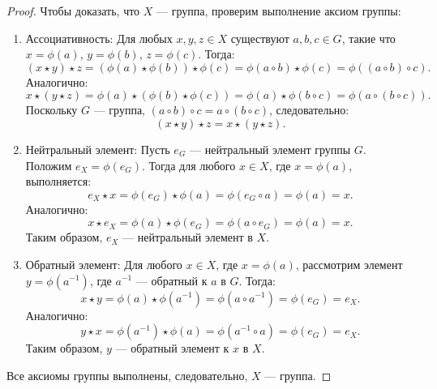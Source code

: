 \begin{proof}
    Чтобы доказать, что \( X \) — группа, проверим выполнение аксиом группы:
    \begin{enumerate}
        \item Ассоциативность:
              Для любых \( x, y, z \in X \) существуют \( a, b, c \in G \), такие что \( x = \phi(a) \), \( y = \phi(b) \), \( z = \phi(c) \). Тогда:
              \[
              (x \star y) \star z = (\phi(a) \star \phi(b)) \star \phi(c) = \phi(a \circ b) \star \phi(c) = \phi((a \circ b) \circ c).
              \]
              Аналогично:
              \[
              x \star (y \star z) = \phi(a) \star (\phi(b) \star \phi(c)) = \phi(a) \star \phi(b \circ c) = \phi(a \circ (b \circ c)).
              \]
              Поскольку \( G \) — группа, \( (a \circ b) \circ c = a \circ (b \circ c) \), следовательно:
              \[
              (x \star y) \star z = x \star (y \star z).
              \]

        \item Нейтральный элемент:
              Пусть \( e_G \) — нейтральный элемент группы \( G \). \\Положим \( e_X = \phi(e_G) \). Тогда для любого \( x \in X \), где \( x = \phi(a) \), выполняется:
              \[
              e_X \star x = \phi(e_G) \star \phi(a) = \phi(e_G \circ a) = \phi(a) = x.
              \]
              Аналогично:
              \[
              x \star e_X = \phi(a) \star \phi(e_G) = \phi(a \circ e_G) = \phi(a) = x.
              \]
              Таким образом, \( e_X \) — нейтральный элемент в \( X \).

        \item Обратный элемент:
              Для любого \( x \in X \), где \( x = \phi(a) \), рассмотрим элемент \( y = \phi(a^{-1}) \), где \( a^{-1} \) — обратный к \( a \) в \( G \). Тогда:
              \[
              x \star y = \phi(a) \star \phi(a^{-1}) = \phi(a \circ a^{-1}) = \phi(e_G) = e_X.
              \]
              Аналогично:
              \[
              y \star x = \phi(a^{-1}) \star \phi(a) = \phi(a^{-1} \circ a) = \phi(e_G) = e_X.
              \]
              Таким образом, \( y \) — обратный элемент к \( x \) в \( X \).
    \end{enumerate}

    Все аксиомы группы выполнены, следовательно, \( X \) — группа.
\end{proof}

\vspace{0.3cm}

